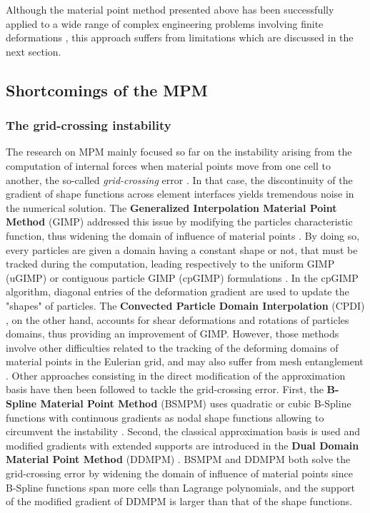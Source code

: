 Although the material point method presented above has been successfully applied to a wide range of complex engineering problems involving finite deformations \cite{Wieckowski}, this approach suffers from limitations which are discussed in the next section. 

\subsection{Shortcomings of the MPM}

\subsubsection*{The grid-crossing instability}
The research on MPM mainly focused so far on the instability arising from the computation of internal forces when material points move from one cell to another, the so-called \textit{grid-crossing} error \cite{Gimp}. In that case, the discontinuity of the gradient of shape functions across element interfaces yields tremendous noise in the numerical solution. The \textbf{Generalized Interpolation Material Point Method} (GIMP) addressed this issue by modifying the particles characteristic function, thus widening the domain of influence of material points \cite{Gimp}. By doing so, every particles are given a domain having a constant shape or not, that must be tracked during the computation, leading respectively to the uniform GIMP (uGIMP) or contiguous particle GIMP (cpGIMP) formulations \cite{Book_MPM}. In the cpGIMP algorithm, diagonal entries of the deformation gradient are used to update the "shapes" of particles. The \textbf{Convected Particle Domain Interpolation} (CPDI) \cite{CPDI}, on the other hand, accounts for shear deformations and rotations of particles domains, thus providing an improvement of GIMP. However, those methods involve other difficulties related to the tracking of the deforming domains of material points in the Eulerian grid, and may also suffer from mesh entanglement \cite{DDMPM0}. Other approaches consisting in the direct modification of the approximation basis have then been followed to tackle the grid-crossing error. First, the \textbf{B-Spline Material Point Method} (BSMPM) \cite{Steffen_quadError} uses quadratic or cubic B-Spline functions with continuous gradients as nodal shape functions allowing to circumvent the instability \cite{MPM_BSpline1}. %
Second, the classical approximation basis is used and modified gradients with extended supports are introduced in the \textbf{Dual Domain Material Point Method} (DDMPM) \cite{DDMPM0}. BSMPM and DDMPM  both solve the grid-crossing error by widening the domain of influence of material points since B-Spline functions span more cells than Lagrange polynomials, and the support of the modified gradient of DDMPM is larger than that of the shape functions.  

